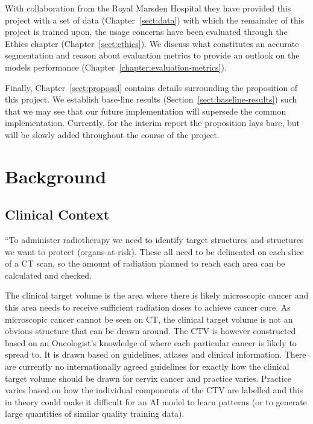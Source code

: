 \documentclass[11pt,twoside]{report}
\begin{document}
With collaboration from the Royal Marsden Hospital they have provided this project with a set of data (Chapter~\ref{sect:data}) with which the remainder of this project is trained upon, the usage concerns have been evaluated through the Ethics chapter (Chapter~\ref{sect:ethics}). We discuss what constitutes an accurate segmentation and reason about evaluation metrics to provide an outlook on the models performance (Chapter~\ref{chapter:evaluation-metrics}).

Finally, Chapter~\ref{sect:proposal} contains details surrounding the proposition of this project. We establish base-line results (Section~\ref{sect:baseline-results}) such that we may see that our future implementation will supersede the common implementation. Currently, for the interim report the proposition lays bare, but will be slowly added throughout the course of the project. 

\chapter{Background}\label{sect:background}

\section{Clinical Context}\label{sect:clinical-context}

``To administer radiotherapy we need to identify target structures and structures we want to protect (organs-at-risk). These all need to be delineated on each slice of a CT scan, so the amount of radiation planned to reach each area can be calculated and checked.

The clinical target volume is the area where there is likely microscopic cancer and this area needs to receive sufficient radiation doses to achieve cancer cure. As microscopic cancer cannot be seen on CT, the clinical target volume is not an obvious structure that can be drawn around. The CTV is however constructed based on an Oncologist's knowledge of where each particular cancer is likely to spread to. It is drawn based on guidelines, atlases and clinical information. There are currently no internationally agreed guidelines for exactly how the clinical target volume should be drawn for cervix cancer and practice varies. Practice varies based on how the individual components of the CTV are labelled and this in theory could make it difficult for an AI model to learn patterns (or to generate large quantities of similar quality training data).
\end{document}
